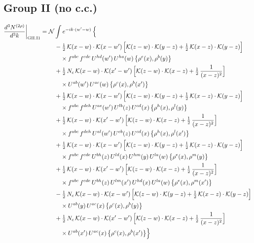 \documentclass[10pt]{article}
\numberwithin{equation}{section}
\newcommand{\KK}{\mathcal K}
\newcommand{\NN}{\mathcal N}
\begin{document}
\subsection*{Group II (no c.c.)}
\begin{align}
\frac{d^3N^{(2\rho)}}{d^3k}\bigg|_{\rm GII.I1}={}&\NN\int e^{-ik\cdot(w'-w)}\,\Big\{\notag\\
&\quad -\tfrac12\,\KK(x-w)\cdot\KK(x-w')\,\Big[\KK(z-w)\cdot\KK(y-z)+\tfrac12\,\KK(x-z)\cdot\KK(y-z)\Big]\notag\\
&\qquad\times f^{abc}\,f^{cde}\,U^{hd}(w')\,U^{ha}(w)\,\big\{\rho^{e}(x),\rho^{b}(y)\big\}\notag\\
&\quad +\tfrac12\,N_{c}\,\KK(x-w)\cdot\KK(x'-w')\,\Big[\KK(z-w)\cdot\KK(x-z)+\tfrac12\,\frac{1}{(x-z)^2}\Big]\notag\\
&\qquad\times U^{ab}(w')\,U^{ac}(w)\,\big\{\rho^{c}(x),\rho^{b}(x')\big\}\notag\\
&\quad +\tfrac12\,\KK(x-w)\cdot\KK(x-w')\,\Big[\KK(z-w)\cdot\KK(y-z)+\tfrac12\,\KK(x-z)\cdot\KK(y-z)\Big]\notag\\
&\qquad\times f^{abc}\,f^{deh}\,U^{ae}(w')\,U^{lb}(z)\,U^{cd}(x)\,\big\{\rho^{h}(x),\rho^{l}(y)\big\}\notag\\
&\quad +\tfrac12\,\KK(x-w)\cdot\KK(x'-w')\,\Big[\KK(z-w)\cdot\KK(x-z)+\tfrac12\,\frac{1}{(x-z)^2}\Big]\notag\\
&\qquad\times f^{abc}\,f^{deh}\,U^{al}(w')\,U^{eb}(z)\,U^{cd}(x)\,\big\{\rho^{h}(x),\rho^{l}(x')\big\}\notag\\
&\quad +\tfrac12\,\KK(x-w)\cdot\KK(x-w')\,\Big[\KK(z-w)\cdot\KK(y-z)+\tfrac12\,\KK(x-z)\cdot\KK(y-z)\Big]\notag\\
&\qquad\times f^{abc}\,f^{cde}\,U^{bh}(z)\,U^{ld}(x)\,U^{hm}(y)\,U^{la}(w)\,\big\{\rho^{e}(x),\rho^{m}(y)\big\}\notag\\
&\quad +\tfrac12\,\KK(x-w)\cdot\KK(x'-w')\,\Big[\KK(z-w)\cdot\KK(x-z)+\tfrac12\,\frac{1}{(x-z)^2}\Big]\notag\\
&\qquad\times f^{abc}\,f^{cde}\,U^{bh}(z)\,U^{lm}(x')\,U^{hd}(x)\,U^{la}(w)\,\big\{\rho^{e}(x),\rho^{m}(x')\big\}\notag\\
&\quad -\tfrac12\,N_{c}\,\KK(x-w)\cdot\KK(x-w')\,\Big[\KK(z-w)\cdot\KK(y-z)+\tfrac12\,\KK(x-z)\cdot\KK(y-z)\Big]\notag\\
&\qquad\times U^{ab}(y)\,U^{ac}(x)\,\big\{\rho^{c}(x),\rho^{b}(y)\big\}\notag\\
&\quad +\tfrac12\,N_{c}\,\KK(x-w)\cdot\KK(x'-w')\,\Big[\KK(z-w)\cdot\KK(x-z)+\tfrac12\,\frac{1}{(x-z)^2}\Big]\notag\\
&\qquad\times U^{ab}(x')\,U^{ac}(x)\,\big\{\rho^{c}(x),\rho^{b}(x')\big\}\Big\}\label{eq:sum-GII.I1}
\end{align}
\end{document}
